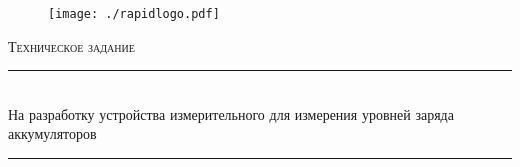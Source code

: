 \begin{titlepage}

\begin{center}
 
\begin{figure}[h!tf]
\begin{center}
\texttt{[image: ./rapidlogo.pdf]}\\[1cm]
\end{center}
\end{figure} 

\textsc{\Large Техническое задание}\\[0.5cm]
 
 
\rule{\linewidth}{0.5mm} \\[0.4cm]
{ \huge { На разработку устройства измерительного для измерения уровней заряда аккумуляторов }}\\[0.4cm]
 
\rule{\linewidth}{0.5mm} \\[1.5cm]

\end{center}

\end{titlepage}
